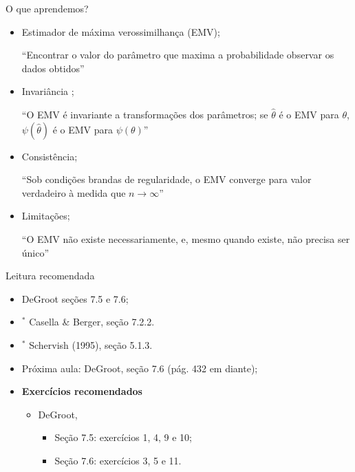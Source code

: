 \begin{frame}{O que aprendemos?}
\begin{itemize}
 \item[\faLightbulbO] Estimador de máxima verossimilhança (EMV);
 
   ``Encontrar o valor do parâmetro que maxima a probabilidade observar os dados obtidos''
   
  \item[\faLightbulbO] Invariância ;
  
  ``O EMV é invariante a transformações dos parâmetros; se $\hat{\theta}$ é o EMV para $\theta$, $\psi(\hat{\theta})$ é o EMV para $\psi(\theta)$''
  
    \item[\faLightbulbO] Consistência;
  
  ``Sob condições brandas de regularidade, o EMV converge para valor verdadeiro à medida que $n \to \infty$''
  
    \item[\faLightbulbO] Limitações;
  
  ``O EMV não existe necessariamente, e, mesmo quando existe, não precisa ser único''
  
  \end{itemize}
 \end{frame}

\begin{frame}{Leitura recomendada}
\begin{itemize}
 \item[\faBook] DeGroot seções 7.5 e 7.6;
 \item[\faBook] $^\ast$ Casella \& Berger, seção 7.2.2.
 \item[\faBook] $^\ast$ Schervish (1995), seção 5.1.3.
   \item[\faForward] Próxima aula: DeGroot, seção 7.6 (pág. 432 em diante);
 \item {\large\textbf{Exercícios recomendados}}
 \begin{itemize}
  \item[\faBookmark] DeGroot,
  \begin{itemize}
   \item Seção 7.5: exercícios  1, 4, 9 e 10;
   \item Seção 7.6: exercícios 3, 5 e 11.
  \end{itemize}   
  \end{itemize}
 \end{itemize} 
\end{frame}

